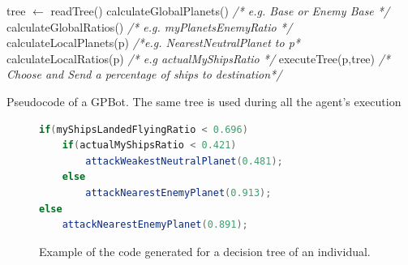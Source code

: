 \documentclass[conference]{IEEEtran}
\begin{document}
\begin{algorithm}[htb]
\begin{algorithmic}

\STATE tree $\leftarrow$ readTree()
  \STATE calculateGlobalPlanets() {\em /* e.g. Base or Enemy Base */}
  \STATE calculateGlobalRatios()  {\em /* e.g. myPlanetsEnemyRatio */}
    \STATE calculateLocalPlanets(p) {\em /*e.g. NearestNeutralPlanet to p*}
    \STATE calculateLocalRatios(p)  {\em /* e.g actualMyShipsRatio */}
    \STATE executeTree(p,tree)  {\em /* Choose and Send a percentage of ships to destination*/}
   \ENDFOR
\ENDWHILE

\end{algorithmic}
\caption{Pseudocode of a GPBot. The same tree is used during all the agent's execution}
\label{algoturn}
\end{algorithm}

\begin{figure}

\begin{lstlisting}[frame=single,language=Java,tabsize=4]
if(myShipsLandedFlyingRatio < 0.696)
	if(actualMyShipsRatio < 0.421)
		attackWeakestNeutralPlanet(0.481);
	else
		attackNearestEnemyPlanet(0.913);
else
	attackNearestEnemyPlanet(0.891);
\end{lstlisting}

%
%
\caption{Example of the code generated for a decision tree of an individual.}
\label{fig:javatree}
\end{figure}


\end{document}
